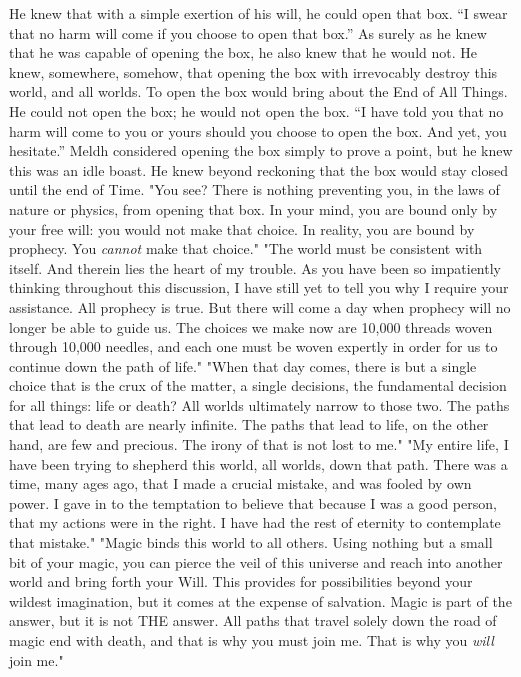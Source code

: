 \begin{flushright}
He knew that with a simple exertion of his will, he could open that box.
\SmallVSpace
“I swear that no harm will come if you choose to open that box.”
\SmallVSpace
As surely as he knew that he was capable of opening the box, he also knew that he would not. He knew, somewhere, somehow, that opening the box with irrevocably destroy this world, and all worlds. To open the box would bring about the End of All Things. He could not open the box; he would not open the box.
\SmallVSpace
“I have told you that no harm will come to you or yours should you choose to open the box. And yet, you hesitate.”
\SmallVSpace
Meldh considered opening the box simply to prove a point, but he knew this was an idle boast. He knew beyond reckoning that the box would stay closed until the end of Time.
\SomeVSpace
"You see? There is nothing preventing you, in the laws of nature or physics, from opening that box. In your mind, you are bound only by your free will: you would not make that choice. In reality, you are bound by prophecy. You \emph{cannot} make that choice."
\SmallVSpace
"The world must be consistent with itself. And therein lies the heart of my trouble. As you have been so impatiently thinking throughout this discussion, I have still yet to tell you why I require your assistance. All prophecy is true. But there will come a day when prophecy will no longer be able to guide us. The choices we make now are 10,000 threads woven through 10,000 needles, and each one must be woven expertly in order for us to continue down the path of life."
\SmallVSpace
"When that day comes, there is but a single choice that is the crux of the matter, a single decisions, the fundamental decision for all things: life or death? All worlds ultimately narrow to those two. The paths that lead to death are nearly infinite. The paths that lead to life, on the other hand, are few and precious. The irony of that is not lost to me."
\SmallVSpace
"My entire life, I have been trying to shepherd this world, all worlds, down that path. There was a time, many ages ago, that I made a crucial mistake, and was fooled by own power. I gave in to the temptation to believe that because I was a good person, that my actions were in the right. I have had the rest of eternity to contemplate that mistake."
\SmallVSpace
"Magic binds this world to all others. Using nothing but a small bit of your magic, you can pierce the veil of this universe and reach into another world and bring forth your Will. This provides for possibilities beyond your wildest imagination, but it comes at the expense of salvation. Magic is part of the answer, but it is not THE answer. All paths that travel solely down the road of magic end with death, and that is why you must join me. That is why you \emph{will} join me."

\end{flushright}

